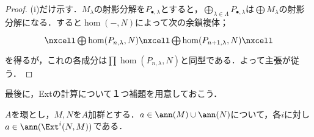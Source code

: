 \begin{proof}
	(i)だけ示す．$M_\lambda$の射影分解を$P_{\bullet,\lambda}$とすると，$\bigoplus_{\lambda\in\Lambda} P_{\bullet,\lambda}$は$\bigoplus M_\lambda$の射影分解になる．すると$\hom(-,N)$によって次の余鎖複体；
	\[\begin{tikzcd}
		\nxcell\bigoplus \hom(P_{n,\lambda},N)\nxcell\bigoplus\hom(P_{n+1,\lambda},N)\nxcell
	\end{tikzcd}\]
	を得るが，これの各成分は$\prod\hom(P_{n,\lambda},N)$と同型である．よって主張が従う．
\end{proof}

最後に，Extの計算について１つ補題を用意しておこう．

\begin{lem}\label{lem:ExtのAnn}
	$A$を環とし，$M,N$を$A$加群とする．$a\in\ann (M)\cup\ann (N)$について，各$i$に対し$a\in\ann(\Ext^i(N,M))$である．
\end{lem}

